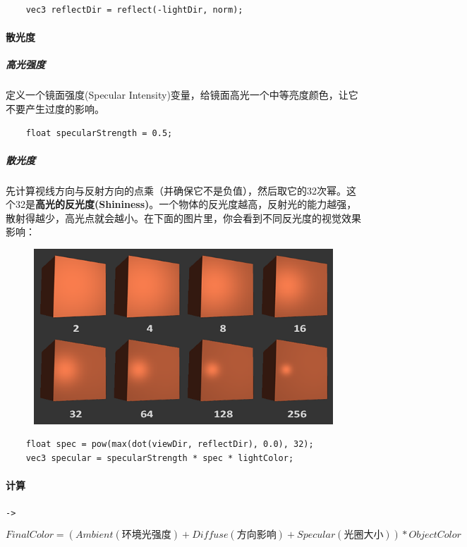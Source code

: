 \documentclass[UTF8,a4paper,12pt]{ctexbook}
\begin{document}
				\begin{lstlisting}
	vec3 reflectDir = reflect(-lightDir, norm);				
				\end{lstlisting}
			
			\paragraph{散光度}
				\subparagraph{高光强度}
					定义一个镜面强度(Specular Intensity)变量，给镜面高光一个中等亮度颜色，让它不要产生过度的影响。
					
					\begin{lstlisting}
	float specularStrength = 0.5;					
					\end{lstlisting}	
									
				\subparagraph{散光度}
					先计算视线方向与反射方向的点乘（并确保它不是负值），然后取它的32次幂。这个32是\textbf{高光的反光度(Shininess)}。一个物体的反光度越高，反射光的能力越强，散射得越少，高光点就会越小。在下面的图片里，你会看到不同反光度的视觉效果影响：
					\begin{figure}[H]
						\centering
						\includegraphics[width=.91\linewidth]{basic_lighting_specular_shininess}
					\end{figure}
					
					\begin{lstlisting}
	float spec = pow(max(dot(viewDir, reflectDir), 0.0), 32);
	vec3 specular = specularStrength * spec * lightColor;				
					\end{lstlisting}
			
			\paragraph{计算}\verb|->|
				
				$$FinalColor = (Ambient(\textbf{环境光强度}) + Diffuse(\textbf{方向影响}) + Specular(\textbf{光圈大小})) * ObjectColor $$
				
\end{document}

